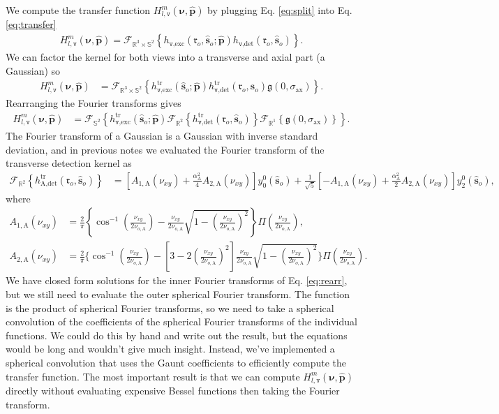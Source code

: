 \documentclass[11pt]{article}
\providecommand{\mc}[1]{\mathcal{#1}}
\providecommand{\ro}{\mathbf{\mathfrak{r}}_o}
\providecommand{\so}{\mathbf{\hat{s}}_o}
\providecommand{\mh}[1]{\mathbf{\hat{#1}}}
\providecommand{\mf}[1]{\mathfrak{#1}}
\providecommand{\mbb}[1]{\mathbb{#1}}
\providecommand{\bs}[1]{\boldsymbol{#1}}
\providecommand{\tv}{\texttt{v}}
\providecommand{\tx}[1]{\text{#1}}
\providecommand{\bv}{\bs{\nu}}
\begin{document}
We compute the transfer function $H_{l,\tv}^m(\bv, \mh{p})$ by plugging Eq.
\ref{eq:split} into Eq. \ref{eq:transfer}
\begin{align}
  H_{l,\tv}^m(\bv, \mh{p}) = \mc{F}_{\mbb{R}^3\times\mbb{S}^2}\left\{h_{\tv, \tx{exc}}(\ro, \so; \mh{p})h_{\tv, \tx{det}}(\ro, \so)\right\}.
\end{align}
We can factor the kernel for both views into a transverse and axial part (a Gaussian) so
\begin{align}
  H_{l,\tv}^m(\bv, \mh{p}) &= \mc{F}_{\mbb{R}^3\times\mbb{S}^2}\left\{h^{\text{tr}}_{\tv, \tx{exc}}(\so; \mh{p})h^{\text{tr}}_{\tv, \tx{det}}(\ro, \so)\mf{g}(0, \sigma_{\text{ax}})\right\}.
\end{align}
Rearranging the Fourier transforms gives
\begin{align}
  H_{l,\tv}^m(\bv, \mh{p}) &= \mc{F}_{\mbb{S}^2}\left\{h^{\text{tr}}_{\tv, \tx{exc}}(\so; \mh{p})\mc{F}_{\mbb{R}^2}\left\{h^{\text{tr}}_{\tv, \tx{det}}(\ro, \so)\right\}\mc{F}_{\mbb{R}^1}\left\{\mf{g}(0, \sigma_{\text{ax}})\right\}\right\}.\label{eq:rearr}
\end{align}
The Fourier transform of a Gaussian is a Gaussian with inverse standard
deviation, and in previous notes we evaluated the Fourier transform of the
transverse detection kernel as
\begin{align}
  \mc{F}_{\mbb{R}^2}\left\{h^{\text{tr}}_{\tx{A}, \tx{det}}(\ro, \so)\right\} &= \left[A_{1,\tx{A}}(\nu_{xy}) + \frac{\alpha_{\tx{A}}^2}{4}A_{2,\tx{A}}(\nu_{xy})\right]y_0^0(\so) + \frac{1}{\sqrt{5}}\left[-A_{1,\tx{A}}(\nu_{xy}) + \frac{\alpha_{\tx{A}}^2}{2}A_{2,\tx{A}}(\nu_{xy})\right]y_2^0(\so),
\end{align}
where
\begin{align}
  A_{1,\tx{A}}(\nu_{xy}) &= \frac{2}{\pi}\left\{\cos^{-1}\left(\frac{\nu_{xy}}{2\nu_{o,\tx{A}}}\right) - \frac{\nu_{xy}}{2\nu_{o,\tx{A}}}\sqrt{1 - \left(\frac{\nu_{xy}}{2\nu_{o,\tx{A}}}\right)^2}\right\}\Pi\left(\frac{\nu_{xy}}{2\nu_{o,\tx{A}}}\right),\\
  A_{2,\tx{A}}(\nu_{xy}) &= \frac{2}{\pi}\Bigg\{\cos^{-1}\left(\frac{\nu_{xy}}{2\nu_{o,\tx{A}}}\right) - \left[3 - 2\left(\frac{\nu_{xy}}{2\nu_{o,\tx{A}}}\right)^2\right]\frac{\nu_{xy}}{2\nu_{o,\tx{A}}}\sqrt{1 - \left(\frac{\nu_{xy}}{2\nu_{o,\tx{A}}}\right)^2}\Bigg\}\Pi\left(\frac{\nu_{xy}}{2\nu_{o,\tx{A}}}\right).
\end{align}
We have closed form solutions for the inner Fourier transforms of Eq.
\ref{eq:rearr}, but we still need to evaluate the outer spherical Fourier
transform. The function is the product of spherical Fourier transforms, so we
need to take a spherical convolution of the coefficients of the spherical
Fourier transforms of the individual functions. We could do this by hand and
write out the result, but the equations would be long and wouldn't give much
insight. Instead, we've implemented a spherical convolution that uses the Gaunt
coefficients to efficiently compute the transfer function. The most important
result is that we can compute $H_{l,\tv}^m(\bv, \mh{p})$ directly without
evaluating expensive Bessel functions then taking the Fourier transform.
\end{document}
